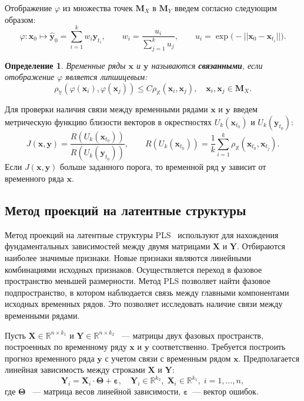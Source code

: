 \documentclass[12pt]{extarticle}
\newcommand{\bx}{\mathbf{x}}
\newcommand{\by}{\mathbf{y}}
\newcommand{\bM}{\mathbf{M}}
\newtheorem{definition}{Определение}
\newcommand{\bbr}{\mathbb{R}}
\begin{document}
Отображение $\varphi$ из множества точек $\bM_X$ в $\bM_Y$ введем согласно \cite{pukenas2018algorithm} следующим образом:
\begin{equation}
\varphi: \bx_0 \mapsto \widehat{\by}_0 = \sum\limits_{i=1}^k w_i \by_{t_i}, \qquad 
w_i = \dfrac{u_i}{\sum\limits_{j=1}^k u_j}, \qquad
u_i = \exp \bigl( -||\bx_0 - \bx_{t_i}|| \bigr).
\end{equation}
\begin{definition}
Временные ряды $\bx$ и $\by$ называются \textbf{связанными}, если отображение $\varphi$ является липшицевым:
	$$ \rho_{\mathbb{Y}}(\varphi(\bx_i), \varphi(\bx_j)) \leq C \rho_{\mathbb{X}}(\bx_i, \bx_j), \quad \bx_i, \bx_j \in \bM_X. $$
\end{definition}
Для проверки наличия связи между временными рядами $\bx$ и $\by$ введем метрическую функцию близости векторов в окрестностях $U_k(\bx_{t_0})$ и $U_k(\by_{t_0})$:
\begin{equation}
    J(\bx, \by) = \dfrac{R(U_k(\bx_{t_0}))}{R(U_k(\by_{t_0}))}, \qquad R(U_k(\bx_{t_0})) = \dfrac{1}{k} \sum\limits_{i=1}^k \rho_{\mathbb{X}}(\bx_{t_0}, \bx_{t_j}).
\end{equation}
Если $J(\bx, \by)$ больше заданного порога, то временной ряд $\by$ зависит от временного ряда $\bx$.
\subsection{Метод проекций на латентные структуры}
Метод проекций на латентные структуры PLS~\cite{geladi1988notes, hoskuldsson1988pls} используют для нахождения фундаментальных зависимостей между двумя матрицами $\mathbf{X}$ и $\mathbf{Y}$. Отбираются наиболее значимые признаки. Новые признаки являются линейными комбинациями исходных признаков. Осуществляется переход в фазовое пространство меньшей размерности. Метод PLS позволяет найти фазовое подпространство, в котором наблюдается связь между главными компонентами исходных временных рядов. Это позволяет исследовать наличие связи между временными рядами. 

Пусть $\mathbf{X}\in\bbr^{n\times k_1}$ и $\mathbf{Y}\in\bbr^{n\times k_2}$ ~--- матрицы двух фазовых пространств, построенных по временному ряду $\bx$ и $\by$ соответственно. Требуется построить прогноз временного ряда $\by$ с учетом связи с временным рядом $\bx$. Предполагается линейная зависимость между строками $\mathbf{X}$ и $\mathbf{Y}$:
\begin{equation}
    \mathbf{Y}_i = \mathbf{X}_i\cdot\mathbf{\Theta} + \boldsymbol{\varepsilon}, \quad \mathbf{Y}_i\in\bbr^{k_2},\;\mathbf{X}_i\in\bbr^{k_1},\; i = 1,\ldots,n,
    \label{eq:linear}
\end{equation}
где $\mathbf{\Theta}$ ~--- матрица весов линейной зависимости,\; $\boldsymbol{\varepsilon}$~--- вектор ошибок.
\end{document}
